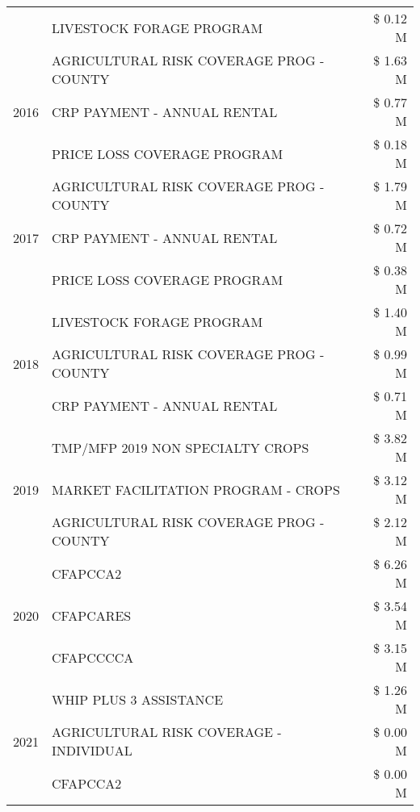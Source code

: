 \begin{tabular}{llr}
 & LIVESTOCK FORAGE PROGRAM & \$ 0.12 M \\
\cline{1-3}
\multirow[t]{3}{*}{2016} & AGRICULTURAL RISK COVERAGE PROG - COUNTY & \$ 1.63 M \\
 & CRP PAYMENT - ANNUAL RENTAL & \$ 0.77 M \\
 & PRICE LOSS COVERAGE PROGRAM & \$ 0.18 M \\
\cline{1-3}
\multirow[t]{3}{*}{2017} & AGRICULTURAL RISK COVERAGE PROG - COUNTY & \$ 1.79 M \\
 & CRP PAYMENT - ANNUAL RENTAL & \$ 0.72 M \\
 & PRICE LOSS COVERAGE PROGRAM & \$ 0.38 M \\
\cline{1-3}
\multirow[t]{3}{*}{2018} & LIVESTOCK FORAGE PROGRAM & \$ 1.40 M \\
 & AGRICULTURAL RISK COVERAGE PROG - COUNTY & \$ 0.99 M \\
 & CRP PAYMENT - ANNUAL RENTAL & \$ 0.71 M \\
\cline{1-3}
\multirow[t]{3}{*}{2019} & TMP/MFP 2019 NON SPECIALTY CROPS & \$ 3.82 M \\
 & MARKET FACILITATION PROGRAM - CROPS & \$ 3.12 M \\
 & AGRICULTURAL RISK COVERAGE PROG - COUNTY & \$ 2.12 M \\
\cline{1-3}
\multirow[t]{3}{*}{2020} & CFAPCCA2 & \$ 6.26 M \\
 & CFAPCARES & \$ 3.54 M \\
 & CFAPCCCCA & \$ 3.15 M \\
\cline{1-3}
\multirow[t]{3}{*}{2021} & WHIP PLUS 3 ASSISTANCE & \$ 1.26 M \\
 & AGRICULTURAL RISK COVERAGE - INDIVIDUAL & \$ 0.00 M \\
 & CFAPCCA2 & \$ 0.00 M \\
\cline{1-3}
\bottomrule
\end{tabular}
